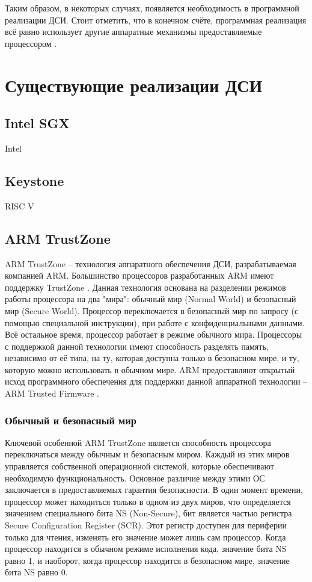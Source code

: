 Таким образом, в некоторых случаях, появляется необходимость в программной реализации ДСИ. Стоит отметить, что в конечном счёте, программная реализация всё равно использует другие аппаратные механизмы предоставляемые процессором \cite{aaa}.
 
\section{Существующие реализации ДСИ}

\subsection{Intel SGX}

Intel

\subsection{Keystone}

RISC V

\subsection{ARM TrustZone}

ARM TrustZone -- технология аппаратного обеспечения ДСИ, разрабатываемая компанией ARM. Большинство процессоров разработанных ARM имеют поддержку TrustZone \cite{comparsion-arm-intel}. Данная технология основана на разделении режимов работы процессора на два "мира": обычный мир (Normal World) и безопасный мир (Secure World). Процессор переключается в безопасный мир по запросу (с помощью специальной инструкции), при работе с конфиденциальными данными. Всё остальное время, процессор работает в режиме обычного мира. Процессоры с поддержкой данной технологии имеют способность разделять память, независимо от её типа, на ту, которая доступна только в безопасном мире, и ту, которую можно использовать в обычном мире. ARM предоставляют открытый исход программного обеспечения для поддержки данной аппаратной технологии -- ARM Trusted Firmware \cite{arm-tfa}.

\subsubsection{Обычный и безопасный мир}

Ключевой особенной ARM TrustZone является способность процессора переключаться между обычным и безопасным миром. Каждый из этих миров управляется собственной операционной системой, которые обеспечивают необходимую функциональность. Основное различие между этими ОС заключается в предоставляемых гарантия безопасности. В один момент времени, процессор может находиться только в одном из двух миров, что определяется значением специального бита NS (Non-Secure), бит является частью регистра Secure Configuration Register (SCR). Этот регистр доступен для периферии только для чтения, изменять его значение может лишь сам процессор. Когда процессор находится в обычном режиме исполнения кода, значение бита NS равно 1, и наоборот, когда процессор находится в безопасном мире, значение бита NS равно 0.

